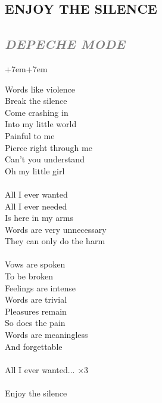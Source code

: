 \documentclass[100pt,a4paper]{report}
\newenvironment{song1}[3]
	{
			\begin{spacing}{0.6}
				\section*{\LARGE\centering \MakeUppercase{\textbf{{#1}}}}
				\subsection*{\Large\centering \textit{\textcolor{gray}{\MakeUppercase{{#2}}}}}
			\end{spacing}
			\vspace{0.8cm}
			\begin{adjustwidth}{+7em}{+7em}
			\Large
			
	}
	{
		\end{adjustwidth}
		\newpage
    }
\begin{document}
\begin{song1}{Enjoy the Silence}{Depeche Mode}
\noindent
Words like violence\\
Break the silence\\
Come crashing in\\
Into my little world\\
Painful to me\\
Pierce right through me\\
Can’t you understand\\
Oh my little girl\\
\\
All I ever wanted\\
All I ever needed\\
Is here in my arms\\
Words are very unnecessary\\
They can only do the harm\\
\\
Vows are spoken\\
To be broken\\
Feelings are intense\\
Words are trivial\\
Pleasures remain\\
So does the pain\\
Words are meaningless\\
And forgettable\\
\\
All I ever wanted... $\times 3$\\
\\
Enjoy the silence
\end{song1}
\end{document}

